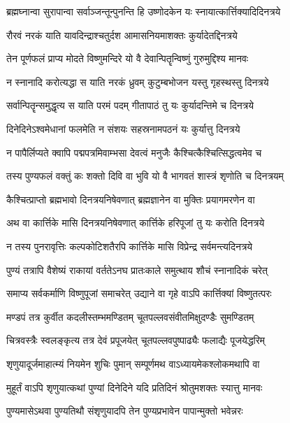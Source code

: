\twolineshloka
{ब्रह्मघ्नान्वा सुरापान्वा सर्वाञ्जन्तून्पुनन्ति हि}
{उष्णोदकेन यः स्नायात्कार्त्तिक्यादिदिनत्रये} %

\twolineshloka
{रौरवं नरकं याति यावदिन्द्राश्चतुर्दश}
{आमासनियमाशक्तः कुर्यादेतद्दिनत्रये} %

\twolineshloka
{तेन पूर्णफलं प्राप्य मोदते विष्णुमन्दिरे}
{यो वै देवान्पितॄन्विष्णुं गुरुमुद्दिश्य मानवः} %

\twolineshloka
{न स्नानादि करोत्यद्धा स याति नरकं ध्रुवम्}
{कुटुम्बभोजन यस्तु गृहस्थस्तु दिनत्रये} %

\twolineshloka
{सर्वान्पितॄन्समुद्धृत्य स याति परमं पदम्}
{गीतापाठं तु यः कुर्यादन्तिमे च दिनत्रये} %

\twolineshloka
{दिनेदिनेऽश्वमेधानां फलमेति न संशयः}
{सहस्रनामपठनं यः कुर्यात्तु दिनत्रये} %

\twolineshloka
{न पापैर्लिप्यते क्वापि पद्मपत्रमिवाम्भसा}
{देवत्वं मनुजैः कैश्चित्कैश्चित्सिद्धत्वमेव च} %

\twolineshloka
{तस्य पुण्यफलं वक्तुं कः शक्तो दिवि वा भुवि}
{यो वै भागवतं शास्त्रं शृणोति च दिनत्रयम्} %

\twolineshloka
{कैश्चित्प्राप्तो ब्रह्मभावो दिनत्रयनिषेवणात्}
{ब्रह्मज्ञानेन वा मुक्तिः प्रयागमरणेन वा} %

\twolineshloka
{अथ वा कार्त्तिके मासि दिनत्रयनिषेवणात्}
{कार्त्तिके हरिपूजां तु यः करोति दिनत्रये} %

\twolineshloka
{न तस्य पुनरावृत्तिः कल्पकोटिशतैरपि}
{कार्त्तिके मासि विप्रेन्द्र सर्वमन्त्यदिनत्रये} %

\twolineshloka
{पुण्यं तत्रापि वैशेष्यं राकायां वर्ततेऽनघ}
{प्रातःकाले समुत्थाय शौचं स्नानादिकं चरेत्} %

\twolineshloka
{समाप्य सर्वकर्माणि विष्णुपूजां समाचरेत्}
{उद्याने वा गृहे वाऽपि कार्त्तिक्यां विष्णुतत्परः} %

\twolineshloka
{मण्डपं तत्र कुर्वीत कदलीस्तम्भमण्डितम्}
{चूतपल्लवसंवीतमिक्षुदण्डैः सुमण्डितम्} %

\twolineshloka
{चित्रवस्त्रैः स्वलङ्कृत्य तत्र देवं प्रपूजयेत्}
{चूतपल्लवपुष्पाढ्यैः फलाद्यैः पूजयेद्धरिम्} %

\twolineshloka
{शृणुयादूर्जमाहात्म्यं नियमेन शुचिः पुमान्}
{सम्पूर्णमथ वाऽध्यायमेकश्लोकमथापि वा} %

\twolineshloka
{मुहूर्तं वाऽपि शृणुयात्कथां पुण्यां दिनेदिने}
{यदि प्रतिदिनं श्रोतुमशक्तः स्यात्तु मानवः} %

\twolineshloka
{पुण्यमासेऽथवा पुण्यतिथौ संशृणुयादपि}
{तेन पुण्यप्रभावेन पापान्मुक्तो भवेन्नरः} %

